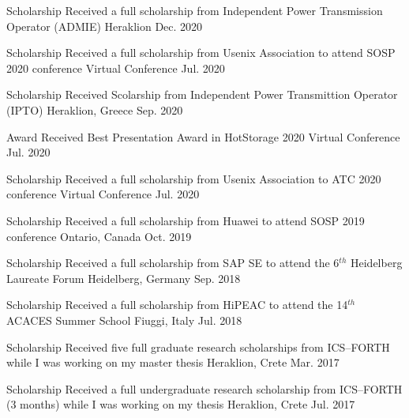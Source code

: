 \begin{cvhonors}
	\cvhonor
	{Scholarship} %
	{Received a full scholarship from Independent Power Transmission
		Operator (ADMIE)} %
	{Heraklion} %
	{Dec. 2020} %

	\cvhonor
	{Scholarship} %
	{Received a full scholarship from Usenix Association to attend
		SOSP 2020 conference} %
	{Virtual Conference} %
	{Jul. 2020} %

	\cvhonor
	{Scholarship} %
	{Received Scolarship from Independent Power Transmittion Operator
		(IPTO)} %
	{Heraklion, Greece} %
	{Sep. 2020} %

	\cvhonor
	{Award} %
	{Received Best Presentation Award in HotStorage 2020} %
	{Virtual Conference} %
	{Jul. 2020} %

	\cvhonor
	{Scholarship} %
	{Received a full scholarship from Usenix Association to ATC 2020
		conference} %
	{Virtual Conference} %
	{Jul. 2020} %

	\cvhonor
	{Scholarship} %
	{Received a full scholarship from Huawei to attend SOSP 2019
		conference} %
	{Ontario, Canada} %
	{Oct. 2019} %

	\cvhonor
	{Scholarship} %
	{Received a full scholarship from SAP SE to attend the 6$^{th}$
		Heidelberg Laureate Forum} %
	{Heidelberg, Germany} %
	{Sep. 2018} %

	\cvhonor
	{Scholarship} %
	{Received a full scholarship from HiPEAC to attend the 14$^{th}$
		ACACES Summer School} %
	{Fiuggi, Italy} %
	{Jul. 2018} %

	\cvhonor
	{Scholarship} %
	{Received five full graduate research scholarships from ICS--FORTH
		while I was working on my master thesis} %
	{Heraklion, Crete} %
	{Mar. 2017} %

	\cvhonor
	{Scholarship} %
	{Received a full undergraduate research scholarship from
		ICS--FORTH (3 months) while I was working on my thesis} %
	{Heraklion, Crete} %
	{Jul. 2017} %


\end{cvhonors}
